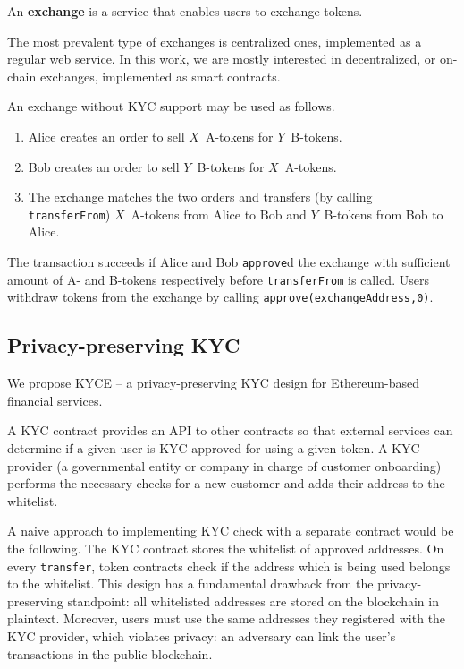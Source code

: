 \begin{definition}
	An \textbf{exchange} is a service that enables users to exchange tokens.
\end{definition}

The most prevalent type of exchanges is centralized ones, implemented as a regular web service.
In this work, we are mostly interested in decentralized, or on-chain exchanges, implemented as smart contracts. 

An exchange without KYC support may be used as follows.
\begin{enumerate}
	\item Alice creates an order to sell $X$~A-tokens for $Y$~B-tokens.
	\item Bob creates an order to sell $Y$~B-tokens for $X$~A-tokens.
	\item The exchange matches the two orders and transfers (by calling \texttt{transferFrom}) $X$~A-tokens from Alice to Bob and $Y$~B-tokens from Bob to Alice.
\end{enumerate}

The transaction succeeds if Alice and Bob \texttt{approve}d the exchange with sufficient amount of A- and B-tokens respectively before \texttt{transferFrom} is called.
Users withdraw tokens from the exchange by calling \texttt{approve(exchangeAddress,0)}.



\subsection{Privacy-preserving KYC}

We propose KYCE -- a privacy-preserving KYC design for Ethereum-based financial services.

A KYC contract provides an API to other contracts so that external services can determine if a given user is KYC-approved for using a given token.
A KYC provider (a governmental entity or company in charge of customer onboarding) performs the necessary checks for a new customer and adds their address to the whitelist.

A naive approach to implementing KYC check with a separate contract would be the following.
The KYC contract stores the whitelist of approved addresses.
On every \texttt{transfer}, token contracts check if the address which is being used belongs to the whitelist.
This design has a fundamental drawback from the privacy-preserving standpoint: all whitelisted addresses are stored on the blockchain in plaintext.
Moreover, users must use the same addresses they registered with the KYC provider, which violates privacy: an adversary can link the user's transactions in the public blockchain.

